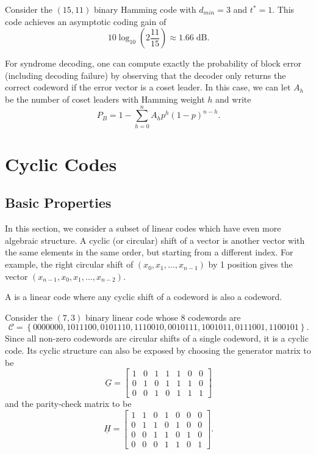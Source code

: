 \begin{example}
Consider the $(15,11)$ binary Hamming code with $d_{min} = 3$ and $t^* = 1$.
This code achieves an asymptotic coding gain of
\[ 10 \log_{10} \left( 2 \frac{11}{15} \right) \approx 1.66 \; \mathrm{dB}. \]
\end{example}

For syndrome decoding, one can compute exactly the probability of block error (including decoding failure) by observing that the decoder only returns the correct codeword if the error vector is a coset leader.
In this case, we can let $A_h$ be the number of coset leaders with Hamming weight $h$ and write
\[ P_{B} = 1-\sum_{h=0}^{n} A_h p^h (1-p)^{n-h}. \]

\section{Cyclic Codes}

\subsection{Basic Properties}
In this section, we consider a subset of linear codes which have even more algebraic structure.
A cyclic (or circular) shift of a vector is another vector with the same elements in the same order, but starting from a different index.
For example, the right circular shift of $(x_0,x_1,\ldots,x_{n-1})$ by 1 position gives the vector $(x_{n-1},x_0,x_1,\ldots,x_{n-2})$.

\begin{definition}
A  is a linear code where any cyclic shift of a codeword is also a codeword.
\end{definition}

\begin{example}
Consider the $(7,3)$ binary linear code whose 8 codewords are
\[ \mathcal{C} = \left\{
0000000,
1011100,
0101110,
1110010,
0010111,
1001011,
0111001,
1100101
\right\}. \]
Since all non-zero codewords are circular shifts of a single codeword, it is a cyclic code.
Its cyclic structure can also be exposed by choosing the generator matrix to be
\[ \underline{G} = \left[ \begin{array}{ccccccc}
1 & 0 & 1 & 1 & 1 & 0 & 0 \\
0 & 1 & 0 & 1 & 1 & 1 & 0 \\
0 & 0 & 1 & 0 & 1 & 1 & 1 \end{array} \right] \]
and the parity-check matrix to be
\[ \underline{H} = \left[ \begin{array}{ccccccc}
1 & 1 & 0 & 1 & 0 & 0 & 0 \\
0 & 1 & 1 & 0 & 1 & 0 & 0 \\
0 & 0 & 1 & 1 & 0 & 1 & 0 \\
0 & 0 & 0 & 1 & 1 & 0 & 1 \end{array} \right]. \]
\end{example}

